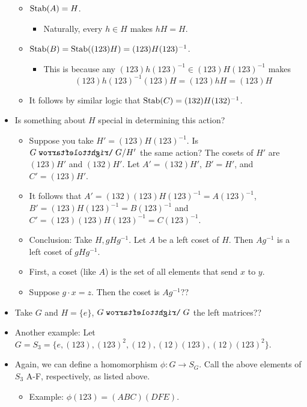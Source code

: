 \documentclass[../notes.tex]{subfiles}
\begin{document}
\begin{itemize}
\begin{itemize}
        \item $\operatorname{Stab}(A)=H$.
        \begin{itemize}
            \item Naturally, every $h\in H$ makes $hH=H$.
        \end{itemize}
        \item $\operatorname{Stab}(B)=\operatorname{Stab}((123)H)=(123)H(123)^{-1}$.
        \begin{itemize}
            \item This is because any $(123)h(123)^{-1}\in(123)H(123)^{-1}$ makes
            \begin{equation*}
                (123)h(123)^{-1}(123)H = (123)hH
                = (123)H
            \end{equation*}
        \end{itemize}
        \item It follows by similar logic that $\operatorname{Stab}(C)=(132)H(132)^{-1}$.
    \end{itemize}
    \item Is something about $H$ special in determining this action?
    \begin{itemize}
        \item Suppose you take $H'=(123)H(123)^{-1}$. Is $G\acts G/H'$ the same action? The cosets of $H'$ are $(123)H'$ and $(132)H'$. Let $A'=(132)H'$, $B'=H'$, and $C'=(123)H'$.
        \item It follows that $A'=(132)(123)H(123)^{-1}=A(123)^{-1}$, $B'=(123)H(123)^{-1}=B(123)^{-1}$ and $C'=(123)(123)H(123)^{-1}=C(123)^{-1}$.
        \item Conclusion: Take $H,gHg^{-1}$. Let $A$ be a left coset of $H$. Then $Ag^{-1}$ is a left coset of $gHg^{-1}$.
        \item First, a coset (like $A$) is the set of all elements that send $x$ to $y$.
        \item Suppose $g\cdot x=z$. Then the coset is $Ag^{-1}$??
    \end{itemize}
    \item Take $G$ and $H=\{e\}$, $G\acts G$ the left matrices??
    \item Another example: Let $G=S_3=\{e,(123),(123)^2,(12),(12)(123),(12)(123)^2\}$.
    \item Again, we can define a homomorphism $\phi:G\to S_G$. Call the above elements of $S_3$ A-F, respectively, as listed above.
    \begin{itemize}
        \item Example: $\phi(123)=(ABC)(DFE)$.

\end{itemize}
\end{itemize}
\end{document}
